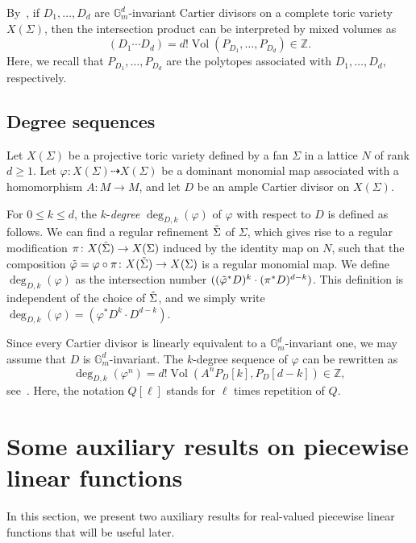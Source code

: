 \documentclass[11pt,a4paper]{article}
\theoremstyle{plain}
\theoremstyle{remark}
\theoremstyle{custombold}
\DeclareMathOperator{\vol}{Vol}
\begin{document}
 By~\cite[p.~79]{Oda-toric-geometry}, if $D_1,\ldots,D_d$ are $\mathbb G_m^d$-invariant Cartier divisors on a complete toric variety $X(\Sigma)$, then the intersection product can be interpreted by mixed volumes as $$(D_1\cdots D_d)=d!\vol(P_{D_1},\ldots,P_{D_d})\in\mathbb Z.$$
 Here, we recall that $P_{D_1},\ldots,P_{D_d}$ are the polytopes associated with $D_1,\ldots,D_d$, respectively. 

\subsection{Degree sequences}

Let $X(\Sigma)$ be a projective toric variety defined by a fan $\Sigma$ in a lattice $N$ of rank $d\geq1$. Let $\varphi\colon X(\Sigma)\dashrightarrow X(\Sigma)$ be a dominant monomial map associated with a homomorphism $A\colon M\rightarrow M$, and let $D$ be an ample Cartier divisor on $X(\Sigma)$.  

For $0\leq k\leq d$, the $k$-\emph{degree} $\deg_{D,k}(\varphi)$ of $\varphi$ with respect to $D$ is defined as follows. We can find a regular refinement $\Tilde{\Sigma}$ of $\Sigma$, which gives rise to a regular modification $\pi\colon X(\Tilde{\Sigma})\rightarrow X(\Sigma)$ induced by the identity map on $N$, such that the composition $\Tilde{\varphi} = \varphi\circ\pi \colon X(\Tilde{\Sigma}) \rightarrow X(\Sigma)$ is a regular monomial map. We define $\deg_{D,k}(\varphi)$ as the intersection number $((\Tilde{\varphi}^*D)^k\cdot(\pi^*D)^{d-k})$. This definition is independent of the choice of $\Tilde{\Sigma}$, and we simply write $\deg_{D,k}(\varphi) = (\varphi^*D^k \cdot D^{d-k})$.

Since every Cartier divisor is linearly equivalent to a $\mathbb G_m^d$-invariant one, we may assume that $D$ is $\mathbb G_m^d$-invariant. The {$k$-degree sequence}  of $\varphi$ can be rewritten as $$\deg_{D,k}(\varphi^n)=d!\vol(A^nP_D[k],P_D[d-k])\in\mathbb Z,$$
see~\cite[Proposition~4.1]{Favre-Wulcan-2012}. Here, the notation $Q[\ell]$ stands for $\ell$ times repetition of $Q$. 


\section{Some auxiliary results on piecewise linear functions}
 

In this section, we present two auxiliary results for real-valued piecewise linear functions that will be useful later. 
\end{document}
